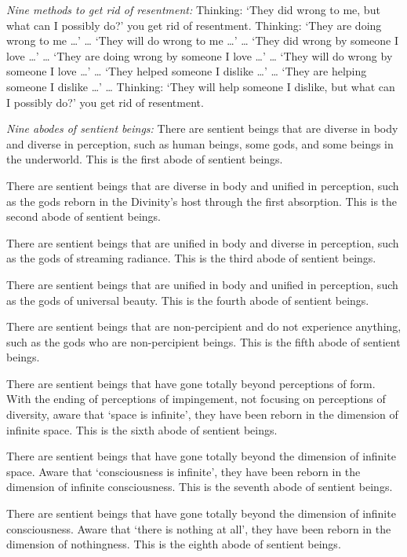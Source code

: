 \documentclass[12pt,openany]{book}%
\begin{document}
\emph{Nine methods to get rid of resentment:} Thinking: ‘They did wrong to me, but what can I possibly do?’ you get rid of resentment. Thinking: ‘They are doing wrong to me …’ … ‘They will do wrong to me …’ … ‘They did wrong by someone I love …’ … ‘They are doing wrong by someone I love …’ … ‘They will do wrong by someone I love …’ … ‘They helped someone I dislike …’ … ‘They are helping someone I dislike …’ … Thinking: ‘They will help someone I dislike, but what can I possibly do?’ you get rid of resentment. 

\emph{Nine abodes of sentient beings:} There are sentient beings that are diverse in body and diverse in perception, such as human beings, some gods, and some beings in the underworld. This is the first abode of sentient beings. 

There are sentient beings that are diverse in body and unified in perception, such as the gods reborn in the Divinity’s host through the first absorption. This is the second abode of sentient beings. 

There are sentient beings that are unified in body and diverse in perception, such as the gods of streaming radiance. This is the third abode of sentient beings. 

There are sentient beings that are unified in body and unified in perception, such as the gods of universal beauty. This is the fourth abode of sentient beings. 

There are sentient beings that are non-percipient and do not experience anything, such as the gods who are non-percipient beings. This is the fifth abode of sentient beings. 

There are sentient beings that have gone totally beyond perceptions of form. With the ending of perceptions of impingement, not focusing on perceptions of diversity, aware that ‘space is infinite’, they have been reborn in the dimension of infinite space. This is the sixth abode of sentient beings. 

There are sentient beings that have gone totally beyond the dimension of infinite space. Aware that ‘consciousness is infinite’, they have been reborn in the dimension of infinite consciousness. This is the seventh abode of sentient beings. 

There are sentient beings that have gone totally beyond the dimension of infinite consciousness. Aware that ‘there is nothing at all’, they have been reborn in the dimension of nothingness. This is the eighth abode of sentient beings. 
\end{document}
